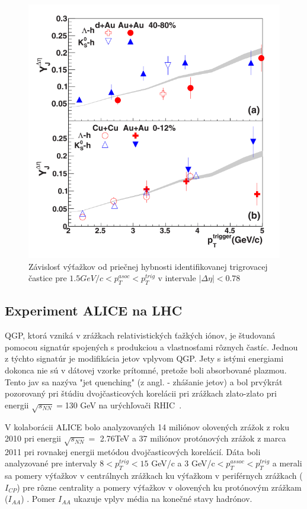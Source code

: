 \documentclass[thesismargins, thesislinespacing]{rnthesis}
\begin{document}
\begin{figure}[hbtp!]
	\centering
	\includegraphics[scale=0.5]{./Obrazky_praca/clanokstar.png}
	\caption{Závislosť výťažkov od priečnej hybnosti identifikovanej trigrovacej častice pre $1.5 GeV/c <p_T^{asoc}<p_T^{trig}$ v intervale $|\Delta\eta|<0.78$ ~\cite{clanokstar}}
	\label{clanokstar}
\end{figure}

\subsection{Experiment ALICE na LHC}
QGP, ktorá vzniká v zrážkach relativistických ťažkých iónov, je študovaná pomocou signatúr spojených s produkciou a vlastnosťami rôznych častíc. Jednou z týchto signatúr je modifikácia jetov vplyvom QGP. Jety s istými energiami dokonca nie sú v dátovej vzorke prítomné, pretože boli absorbované plazmou. Tento jav sa nazýva "jet quenching" (z angl. - zhášanie jetov) a bol prvýkrát pozorovaný pri štúdiu dvoj\-čas\-ti\-co\-vých korelácii pri zrážkach zlato-zlato pri energii $\sqrt{s_{NN}}=$130 GeV na urýchľovači RHIC~\cite{rhic}.

V kolaborácii ALICE bolo analyzovaných 14 miliónov olovených zrážok z roku 2010 pri energii $\sqrt{s_{NN}}=$ 2.76TeV a 37 miliónov protónových zrážok z marca 2011 pri rovnakej energii metódou dvojčasticových korelácií. Dáta boli analyzované pre intervaly $8<p^{trig}_{T}<15$ GeV/c a 3 GeV/c$<p^{assoc}_{T}<p_T^{trig}$ a merali sa pomery výťažkov v centrálnych zrážkach ku výťažkom v periférnych zrážkach ($I_{CP}$) pre rôzne centrality a pomery výťažkov v olovených ku protónovým zrážkam ($I_{AA}$) \cite{clanok}. Pomer $I_{AA}$ ukazuje vplyv média na konečné stavy hadrónov. 
\end{document}

